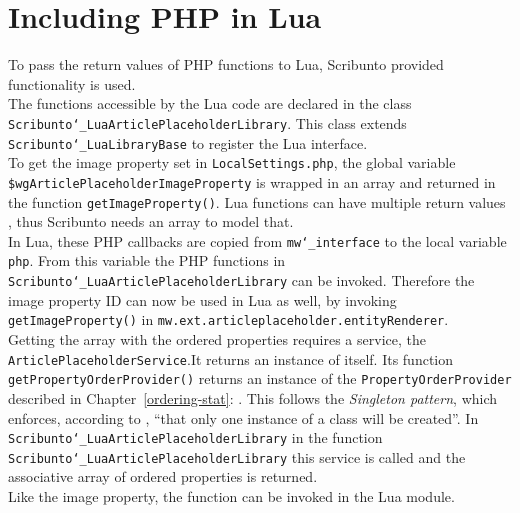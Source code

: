 \section{Including PHP in Lua}\label{including-lua}

To pass the return values of PHP functions to Lua, Scribunto provided functionality is used. \\
The functions accessible by the Lua code are declared in the class \texttt{\justify Scribunto\char`_LuaArticlePlaceholderLibrary}. This class extends \texttt{\justify Scribunto\char`_LuaLibraryBase} to register the Lua interface. \\
To get the image property set in \texttt{\justify LocalSettings.php}, the global variable \texttt{\justify \$wgArticlePlaceholderImageProperty} is wrapped in an array and returned in the function \texttt{\justify getImageProperty()}. Lua functions can have multiple return values \citep{luabook:01}, thus Scribunto needs an array to model that. \\
In Lua, these PHP callbacks are copied from \texttt{\justify mw\char`_interface} to the local variable \texttt{php}. From this variable the PHP functions in \texttt{\justify Scribunto\char`_LuaArticlePlaceholderLibrary} can be invoked. Therefore the image property ID can now be used in Lua as well, by invoking \texttt{\justify getImageProperty()} in \texttt{\justify mw.ext.articleplaceholder.entityRenderer}. \\
Getting the array with the ordered properties requires a service, the \texttt{ArticlePlaceholderService}.It returns an instance of itself. Its function \texttt{\justify getPropertyOrderProvider()} returns an instance of the \texttt{\justify PropertyOrderProvider} described in Chapter~\ref{ordering-stat}: . This follows the \textit{Singleton pattern}, which enforces, according to \citet{designpattern}, ``that only one instance of a class will be created''.
In \texttt{\justify Scribunto\char`_LuaArticlePlaceholderLibrary} in the function \texttt{\justify Scribunto\char`_LuaArticlePlaceholderLibrary} this service is called and the associative array of ordered properties is returned.\\
Like the image property, the function can be invoked in the Lua module.
